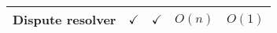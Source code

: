 \begin{table*}[!htbp]
\begin{center}
\begin{tabular}{|c|c|c|c|c|}
 \scriptsize Dispute resolver&\scriptsize$\checkmark$&\scriptsize$\checkmark$& \cellcolor{gray!20}\scriptsize $O(n)$& \cellcolor{gray!20}\scriptsize$O(1)$\\
 
    \cline{1-5}  
    \cline{1-5}  

 \hline

 
 
\end{tabular}  %
\end{center}

\end{table*}




